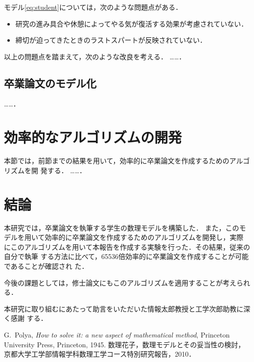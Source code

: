 \documentclass[dvipdfmx]{ampbt}
\begin{document}
モデル\eqref{eq:student}については，次のような問題点がある．
\begin{itemize}
\item 研究の進み具合や休憩によってやる気が復活する効果が考慮されていない．
\item 締切が迫ってきたときのラストスパートが反映されていない．
\end{itemize}

以上の問題点を踏まえて，次のような改良を考える．
……．

\subsection{卒業論文のモデル化}
……．

\section{効率的なアルゴリズムの開発}
本節では，前節までの結果を用いて，効率的に卒業論文を作成するためのアルゴリズムを開
発する．
……．

\section{結論}
本研究では，卒業論文を執筆する学生の数理モデルを構築した．
また，このモデルを用いて効率的に卒業論文を作成するためのアルゴリズムを開発し，実際
にこのアルゴリズムを用いて本報告を作成する実験を行った．その結果，従来の自分で執筆
する方法に比べて，65536倍効率的に卒業論文を作成することが可能であることが確認され
た．

今後の課題としては，修士論文にもこのアルゴリズムを適用することが考えられる．

\acknowledgment
本研究に取り組むにあたって助言をいただいた情報太郎教授と工学次郎助教に深く感謝
する．

\begin{thebibliography}{10}
  G.~Polya, \textit{How to solve it: a new aspect of mathematical method},
  Princeton University Press, Princeton, 1945.
  数理花子，数理モデルとその妥当性の検討，
  京都大学工学部情報学科数理工学コース特別研究報告，2010．
\end{thebibliography}
\end{document}
